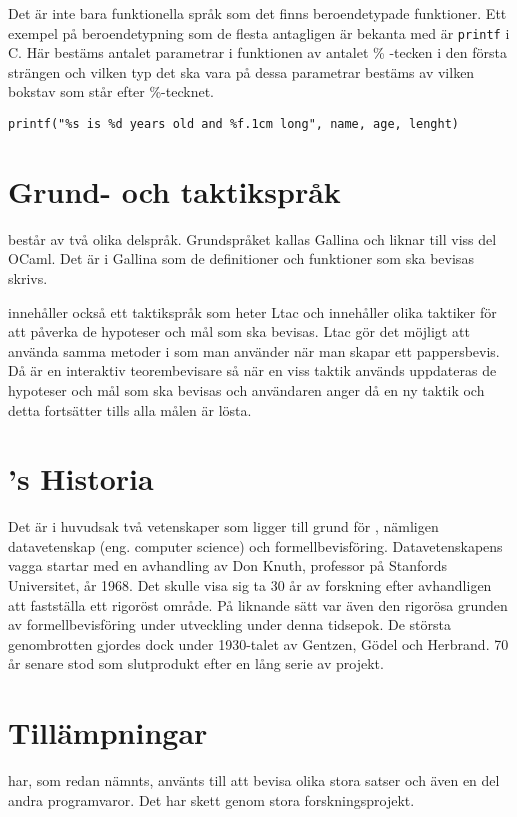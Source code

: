 Det är inte bara funktionella språk som det finns beroendetypade funktioner.
Ett exempel på beroendetypning som de flesta antagligen är bekanta med är
\texttt{printf} i C. Här bestäms antalet parametrar i funktionen av antalet
\% -tecken i den första strängen och vilken typ det ska vara på dessa
parametrar bestäms av vilken bokstav som står efter \%-tecknet.
\begin{verbatim}
printf("%s is %d years old and %f.1cm long", name, age, lenght)
\end{verbatim}


\section{Grund- och taktikspråk}
\coq består av två olika delspråk. Grundspråket kallas Gallina och liknar till
viss del OCaml. Det är i Gallina som de definitioner och funktioner som ska
bevisas skrivs.

\coq innehåller också ett taktikspråk som heter Ltac och innehåller olika
taktiker för att påverka de hypoteser och mål som ska bevisas. Ltac gör det
möjligt att använda samma metoder i \coq som man använder när man skapar ett
pappersbevis. Då \coq är en interaktiv teorembevisare så när en viss taktik
används uppdateras de hypoteser och mål som ska bevisas och användaren
anger då en ny taktik och detta fortsätter tills alla målen är lösta.

\section{\coq's Historia}
Det är i huvudsak två vetenskaper som ligger till grund för \coq, nämligen
datavetenskap (eng. computer science) och formellbevisföring. Datavetenskapens
vagga startar med en avhandling av Don Knuth, professor på Stanfords
Universitet, år 1968. Det skulle visa sig ta 30 år av forskning efter
avhandligen att fastställa ett rigoröst område. På liknande sätt var även den
rigorösa grunden av formellbevisföring under utveckling under denna tidsepok.
De största genombrotten gjordes dock under 1930-talet av Gentzen, Gödel och
Herbrand. 70 år senare stod \coq som slutprodukt efter en lång serie av projekt.

\section{Tillämpningar}
\coq har, som redan nämnts, använts till att bevisa olika stora satser och även
en del andra programvaror. Det har skett genom stora forskningsprojekt.

